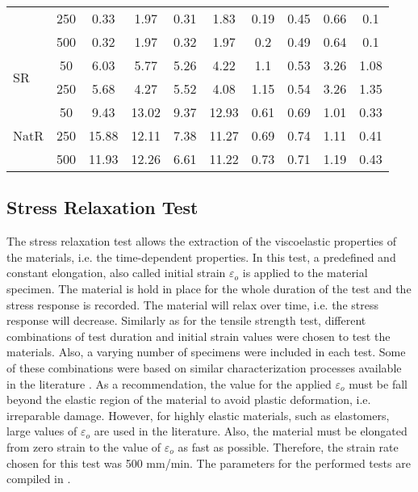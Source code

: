 \begin{table*}[htb!]
\begin{tabular}{lccccccccc}
                           & 250   & 0.33       & 1.97       & 0.31    & 1.83    & 0.19    & 0.45    & 0.66     & 0.1       \\
                           & 500   & 0.32       & 1.97       & 0.32    & 1.97    & 0.2     & 0.49    & 0.64     & 0.1       \\
\hline
\multirow{2}{*}{SR}      & 50    & 6.03       & 5.77       & 5.26    & 4.22    & 1.1     & 0.53    & 3.26     & 1.08      \\
                           & 250   & 5.68       & 4.27       & 5.52    & 4.08    & 1.15    & 0.54    & 3.26     & 1.35      \\
\hline
\multirow{3}{*}{NatR} & 50    & 9.43       & 13.02      & 9.37    & 12.93   & 0.61    & 0.69    & 1.01     & 0.33      \\
                           & 250   & 15.88      & 12.11      & 7.38    & 11.27   & 0.69    & 0.74    & 1.11     & 0.41      \\
                           & 500   & 11.93      & 12.26      & 6.61    & 11.22   & 0.73    & 0.71    & 1.19     & 0.43     \\
\bottomrule
\end{tabular}
\end{table*}


\subsection{Stress Relaxation Test}

The stress relaxation test allows the extraction of the viscoelastic properties of the materials, i.e. the time-dependent properties. In this test, a predefined and constant elongation, also called initial strain $\varepsilon_o$ is applied to the material specimen. The material is hold in place for the whole duration of the test and the stress response is recorded. The material will relax over time, i.e. the stress response will decrease. Similarly as for the tensile strength test, different combinations of test duration and initial strain values were chosen to test the materials. Also, a varying number of specimens were included in each test. Some of these combinations were based on similar characterization processes available in the literature \cite{case2015soft,delin1995volume}. As a recommendation, the value for the applied $\varepsilon_o$ must be fall beyond the elastic region of the material to avoid plastic deformation, i.e. irreparable damage. However, for highly elastic materials, such as elastomers, large values of $\varepsilon_o$ are used in the literature. Also, the material must be elongated from zero strain to the value of $\varepsilon_o$ as fast as possible. Therefore, the strain rate chosen for this test was  500 mm/min. The parameters for the performed tests are compiled in .

